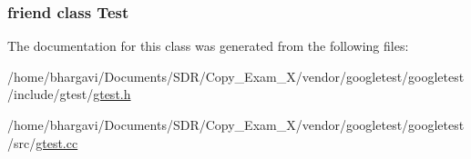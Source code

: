 \subsubsection[{\texorpdfstring{Test}{Test}}]{\setlength{\rightskip}{0pt plus 5cm}friend class {\bf Test}\hspace{0.3cm}{\ttfamily [friend]}}\hypertarget{classtesting_1_1_test_case_a5b78b1c2e1fa07ffed92da365593eaa4}{}\label{classtesting_1_1_test_case_a5b78b1c2e1fa07ffed92da365593eaa4}


The documentation for this class was generated from the following files\+:\begin{DoxyCompactItemize}
\item 
/home/bhargavi/\+Documents/\+S\+D\+R/\+Copy\+\_\+\+Exam\+\_\+X/vendor/googletest/googletest/include/gtest/\hyperlink{gtest_8h}{gtest.\+h}\item 
/home/bhargavi/\+Documents/\+S\+D\+R/\+Copy\+\_\+\+Exam\+\_\+X/vendor/googletest/googletest/src/\hyperlink{gtest_8cc}{gtest.\+cc}\end{DoxyCompactItemize}
